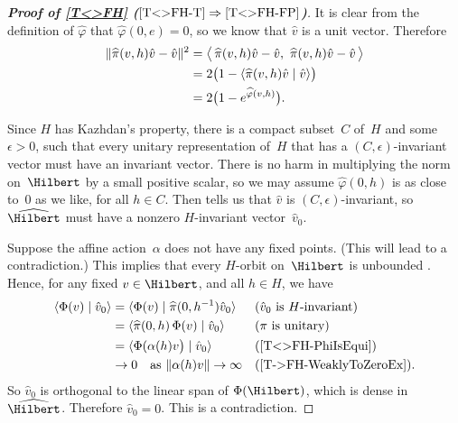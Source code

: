 \begin{proof}[\bf {} Proof of \cref{T<>FH} ($\ref{T<>FH-T} \Rightarrow\ref{T<>FH-FP}$)]
It is clear from the definition of $\widehat\varphi$ that $\widehat\varphi(0,e) = 0$, so we know that $\hat v$ is a unit vector. Therefore
	\begin{align}
	\| \widehat\pi(v,h) \hat v - \hat v\|^2 
	&= \bigl\langle \, \widehat\pi(v,h) \hat v - \hat v, \ \widehat\pi(v,h) \hat v - \hat v \,\bigr\rangle 
	\notag
	\\&= 2 \bigl( 1 - \langle \widehat\pi(v,h) \hat v \mid \hat v \rangle \bigr)
	\label{T<>FHPf-AlmInvt}
	\\& = 2 \bigl( 1 - e^{\widehat\varphi(v,h)} \bigr) 
	\notag
	 .\end{align}

Since $H$ has Kazhdan's property, there is a compact subset~$C$ of~$H$ and some $\epsilon > 0$, such that every unitary representation of~$H$ that has a $(C,\epsilon)$-invariant vector must have an invariant vector. There is no harm in multiplying the norm on~$\Hilbert$ by a small positive scalar, so we may assume $\widehat\varphi(0,h)$ is as close to~$0$ as we like, for all $h \in C$. Then  tells us that $\hat v$ is $(C,\epsilon)$-invariant, so $\widehat\Hilbert$ must have a nonzero $H$-invariant vector~$\hat v_0$.

Suppose the affine action~$\alpha$ does not have any fixed points. (This will lead to a contradiction.) This implies that every $H$-orbit on~$\Hilbert$ is unbounded . Hence, for any fixed $v \in \Hilbert$, and all $h \in H$, we have
	\begin{align*}
	\langle \Phi(v) \mid \hat v_0 \rangle
	&= \langle \Phi(v) \mid \widehat\pi(0,h^{-1}) \hat v_0 \rangle
	&& \text{($\hat v_0$ is $H$-invariant)}
	\\&= \langle  \widehat\pi(0,h) \, \Phi(v)  \mid \hat v_0 \rangle
	&& \text{($\pi$ is unitary)}
	\\&= \langle  \Phi( \alpha(h)v \bigr) \mid \hat v_0 \rangle
	&& \text{(\ref{T<>FH-PhiIsEqui})}
	\\&\to 0 \text{\quad as $\|\alpha(h) v\| \to \infty$}
	&& \text{(\cref{T->FH-WeaklyToZeroEx})}
	.\end{align*}
So $\hat v_0$ is orthogonal to the linear span of $\Phi(\Hilbert)$, which is dense in~$\widehat\Hilbert$. Therefore $\hat v_0 = 0$. This is a contradiction.
\end{proof}




